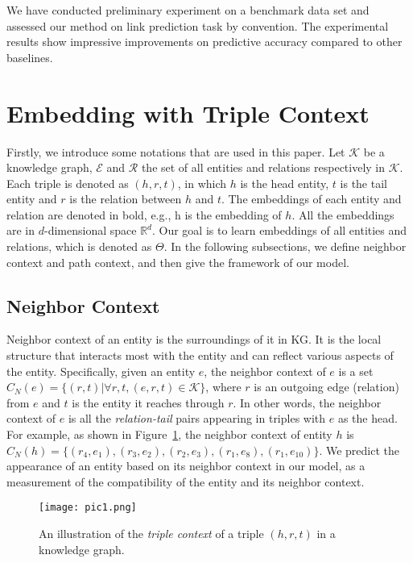We have conducted preliminary experiment on a benchmark data set and assessed our method on link prediction task by convention. The experimental results show impressive improvements on predictive accuracy compared to other baselines.




\section{Embedding with Triple Context}
Firstly, we introduce some notations that are used in this paper. Let $\mathcal{K}$ be a knowledge graph, $\mathcal{E}$ and $\mathcal{R}$ the set of all entities and relations respectively in $\mathcal{K}$. Each triple is denoted as $(h, r, t)$, in which $h$ is the head entity, $t$ is the tail entity and $r$ is the relation between $h$ and $t$. The embeddings of each entity and relation are denoted in bold, e.g., $\bm{\mathrm{h}}$ is the embedding of $h$. All the embeddings are in $d$-dimensional space $\mathbb{R}^d$. Our goal is to learn embeddings of all entities and relations, which is denoted as $\Theta$. In the following subsections, we define neighbor context and path context, and then give the framework of our model.

\subsection{Neighbor Context}
Neighbor context of an entity is the surroundings of it in KG. It is the local structure that interacts most with the entity and can reflect various aspects of the entity. Specifically, given an entity $e$, the neighbor context of $e$ is a set $C_N(e)=\{(r,t)|\forall r, t, (e,r,t)\in\mathcal{K}\}$, where $r$ is an outgoing edge (relation) from $e$ and $t$ is the entity it reaches through $r$. In other words, the neighbor context of $e$ is all the \textit{relation-tail} pairs appearing in triples with $e$ as the head. For example, as shown in Figure~\ref{pic1}, the neighbor context of entity $h$ is $C_N(h)=\{(r_4, e_1), (r_3, e_2), (r_2, e_3), (r_1, e_8), (r_1, e_{10})\}$. We predict the appearance of an entity based on its neighbor context in our model, as a measurement of the compatibility of the entity and its neighbor context.

\begin{figure}
  \texttt{[image: pic1.png]}
  \caption{An illustration of the \emph{triple context} of a triple $(h,r,t)$ in a knowledge graph.}
  \label{pic1}
\end{figure}



